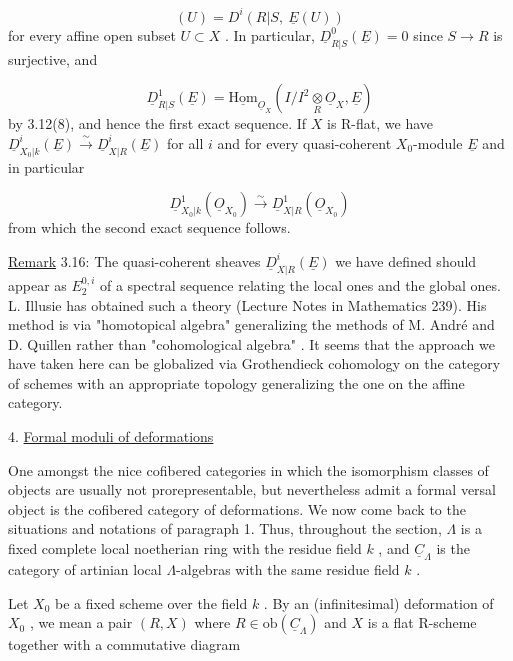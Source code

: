 \begin{equation*}
[\underline{D}^i_{R|S}(\underline{E})](U) = D^i(R|S,\ \underline{E}(U))
\end{equation*}
for every affine open subset  $U \subset X$ . In particular,  $\underline{D}^0_{R|S}(\underline{E}) = 0$  since  $S \to R$ is surjective, and

\begin{equation*}
\underline{D}^1_{R|S}(\underline{E}) = \underline{\mathrm{Hom}}_{\underline{O}_X}(I/I^2\underset{R}{\otimes}\underline{O}_X, \underline{E})
\end{equation*}
by 3.12(8), and hence the first exact sequence. If  $X$  is R-flat, we have
$\underline{D}^i_{X_0|k}(\underline{E}) \overset{\sim}{\to} \underline{D}^i_{X|R}(\underline{E})$  for all  $i$  and for every quasi-coherent $X_0$-module  $\underline{E}$  and in particular

\begin{equation*}
\underline{D}^1_{X_0|k}(\underline{O}_{X_0}) \overset{\sim}{\to} \underline{D}^1_{X|R}(\underline{O}_{X_0})
\end{equation*}
from which the second exact sequence follows.

\underline{Remark} 3.16:  The quasi-coherent sheaves  $\underline{D}^i_{X|R}(\underline{E})$  we have defined should appear as  $E_2^{0,i}$  of a spectral sequence relating the local ones and the global ones. L. Illusie has obtained such a theory (Lecture Notes in Mathematics 239). His method is via  "homotopical algebra"  generalizing the methods of M. André and D. Quillen rather than  "cohomological algebra" . It seems that the approach we have taken here can be globalized via Grothendieck cohomology on the category of schemes with an appropriate topology generalizing the one on the affine category.


4.  \underline{Formal moduli of deformations}

One amongst the nice cofibered categories in which the isomorphism classes of objects are usually not prorepresentable, but nevertheless admit a formal versal object is the cofibered category of deformations. We now come back to the situations and notations of paragraph 1. Thus, throughout the section,  $\Lambda$  is a fixed complete local noetherian ring with the residue field  $k$ , and  $\underline{C}_{\Lambda}$  is the category of artinian local $\Lambda$-algebras with the same residue field  $k$ .

Let  $X_0$  be a fixed scheme over the field  $k$ . By an (infinitesimal) deformation of  $X_0$ , we mean a pair  $(R, X)$  where  $R \in \mathrm{ob}(\underline{C}_{\Lambda})$  and  $X$  is a flat R-scheme together with a commutative diagram

